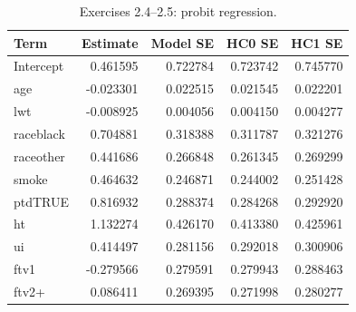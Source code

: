\begin{table}[htbp]
\centering
\small
\caption{Exercises 2.4--2.5: probit regression.}
\begin{tabular}{lrrrr}
\toprule
Term & Estimate & Model SE & HC0 SE & HC1 SE \\
\midrule
Intercept & 0.461595 & 0.722784 & 0.723742 & 0.745770 \\
age & -0.023301 & 0.022515 & 0.021545 & 0.022201 \\
lwt & -0.008925 & 0.004056 & 0.004150 & 0.004277 \\
raceblack & 0.704881 & 0.318388 & 0.311787 & 0.321276 \\
raceother & 0.441686 & 0.266848 & 0.261345 & 0.269299 \\
smoke & 0.464632 & 0.246871 & 0.244002 & 0.251428 \\
ptdTRUE & 0.816932 & 0.288374 & 0.284268 & 0.292920 \\
ht & 1.132274 & 0.426170 & 0.413380 & 0.425961 \\
ui & 0.414497 & 0.281156 & 0.292018 & 0.300906 \\
ftv1 & -0.279566 & 0.279591 & 0.279943 & 0.288463 \\
ftv2+ & 0.086411 & 0.269395 & 0.271998 & 0.280277 \\
\bottomrule
\end{tabular}
\end{table}
